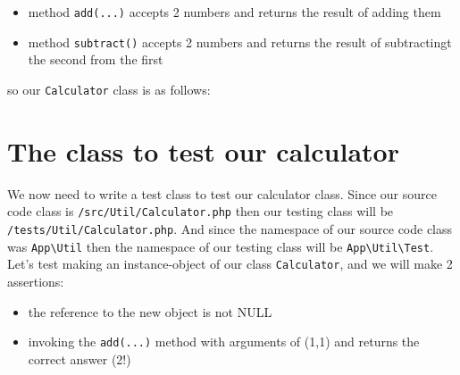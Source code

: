 \documentclass[a4paperpaper,openright]{book}
\newenvironment{Shaded}{}{}
\newcommand{\KeywordTok}[1]{\textcolor[rgb]{0.00,0.44,0.13}{\textbf{#1}}}
\newcommand{\NormalTok}[1]{#1}
\newcommand{\OtherTok}[1]{\textcolor[rgb]{0.00,0.44,0.13}{#1}}
\begin{document}
\begin{itemize}
\item
  method \texttt{add(...)} accepts 2 numbers and returns the result of
  adding them
\item
  method \texttt{subtract()} accepts 2 numbers and returns the result of
  subtractingt the second from the first
\end{itemize}

so our \texttt{Calculator} class is as follows:

\begin{Shaded}
\end{Shaded}

\hypertarget{the-class-to-test-our-calculator}{%
\section{The class to test our
calculator}\label{the-class-to-test-our-calculator}}

We now need to write a test class to test our calculator class. Since
our source code class is \texttt{/src/Util/Calculator.php} then our
testing class will be \texttt{/tests/Util/Calculator.php}. And since the
namespace of our source code class was \texttt{App\textbackslash{}Util}
then the namespace of our testing class will be
\texttt{App\textbackslash{}Util\textbackslash{}Test}. Let's test making
an instance-object of our class \texttt{Calculator}, and we will make 2
assertions:

\begin{itemize}
\item
  the reference to the new object is not NULL
\item
  invoking the \texttt{add(...)} method with arguments of (1,1) and
  returns the correct answer (2!)
\end{itemize}
\end{document}
